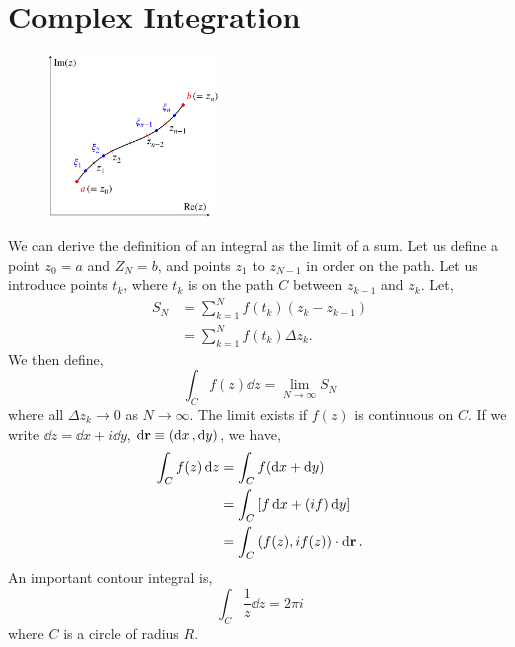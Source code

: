\documentclass{book}
\begin{document}
\section{Complex Integration}
\begin{figure}[h]
	\centering
	\includegraphics[width=0.4\textwidth]{contour.png}
	\caption{}
	\label{eq:contour}
\end{figure}
We can derive the definition of an integral as the limit of a sum. Let us define a point $z_0 = a$ and $Z_N = b$, and points $z_1$ to $z_{N-1}$ in order on the path. Let us introduce points $t_k$, where $t_k$ is on the path $C$ between $z_{k-1}$ and $z_k$. Let,
\begin{equation}
	\begin{split}
	S_N & = \sum_{k=1}^Nf(t_k)(z_k-z_{k-1}) \\
	& = \sum_{k=1}^Nf(t_k)\Delta z_k.
	\end{split}
\end{equation}
We then define,
\begin{equation}
	\int_C f(z)\dd{z} = \lim_{N \to \infty} S_N
\end{equation}
where all $\Delta z_k \to 0$ as $N \to \infty$. The limit exists if $f(z)$ is continuous on $C$. If we write $\dd{z} = \dd{x} + i\dd{y}$, $\dd{\vb{r}} \equiv \left(\dd{x},\dd{y}\right)$, we have,
\begin{equation}
	\begin{split}
		\int_C f(z)\dd{z} & = \int_Cf(\dd{x} + \dd{y}) \\
		& = \int_C\left[f\dd{x} + (if)\dd{y}\right] \\
		& = \int_C \left(f(z), if(z)\right)\cdot\dd{\vb{r}}.
	\end{split}
\end{equation}
An important contour integral is,
\begin{equation}
	\int_C\frac{1}{z}\dd{z} = 2\pi i \label{eq:2pi}
\end{equation}
where $C$ is a circle of radius $R$.
\end{document}

